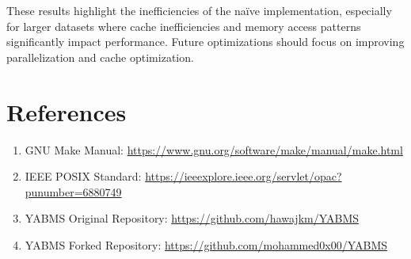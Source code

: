 \documentclass[12pt]{article}
\begin{document}
These results highlight the inefficiencies of the naïve implementation, especially for larger datasets where cache inefficiencies and memory access patterns significantly impact performance. Future optimizations should focus on improving parallelization and cache optimization.

\section{References}
\begin{enumerate}
    \item GNU Make Manual: \url{https://www.gnu.org/software/make/manual/make.html}
    \item IEEE POSIX Standard: \url{https://ieeexplore.ieee.org/servlet/opac?punumber=6880749}
    \item YABMS Original Repository: \url{https://github.com/hawajkm/YABMS}
    \item YABMS Forked Repository: \url{https://github.com/mohammed0x00/YABMS}
\end{enumerate}
\end{document}
